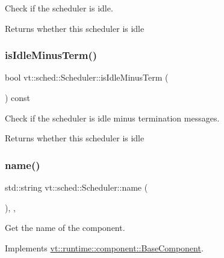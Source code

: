 Check if the scheduler is idle. 

\begin{DoxyReturn}{Returns}
whether this scheduler is idle 
\end{DoxyReturn}
\mbox{\label{structvt_1_1sched_1_1_scheduler_a3229e007ac15bfb1d337428a52157817}} 
\subsubsection{\texorpdfstring{is\+Idle\+Minus\+Term()}{isIdleMinusTerm()}}
{\footnotesize\ttfamily bool vt\+::sched\+::\+Scheduler\+::is\+Idle\+Minus\+Term (\begin{DoxyParamCaption}{ }\end{DoxyParamCaption}) const\hspace{0.3cm}{\ttfamily [inline]}}



Check if the scheduler is idle minus termination messages. 

\begin{DoxyReturn}{Returns}
whether this scheduler is idle 
\end{DoxyReturn}
\mbox{\label{structvt_1_1sched_1_1_scheduler_a60d76cb810df35be76d414226c24d6c4}} 
\subsubsection{\texorpdfstring{name()}{name()}}
{\footnotesize\ttfamily std\+::string vt\+::sched\+::\+Scheduler\+::name (\begin{DoxyParamCaption}{ }\end{DoxyParamCaption})\hspace{0.3cm}{\ttfamily [inline]}, {\ttfamily [override]}, {\ttfamily [virtual]}}



Get the name of the component. 



Implements \hyperlink{structvt_1_1runtime_1_1component_1_1_base_component_a7701485f3539f78d42e6bad47fc7eb78}{vt\+::runtime\+::component\+::\+Base\+Component}.

